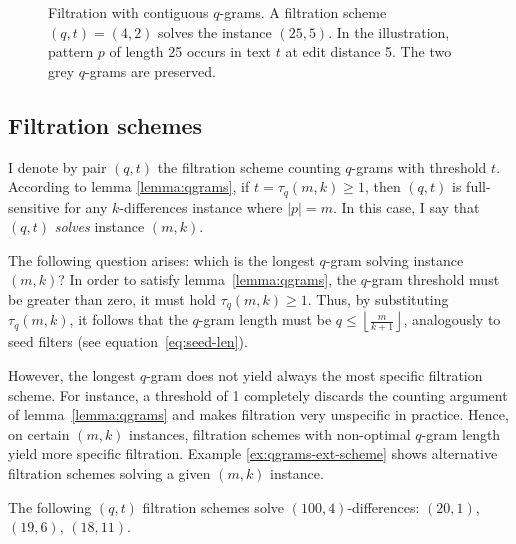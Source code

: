 \begin{figure}[h]
\begin{center}
\caption[Filtration with contiguous $q$-grams]{Filtration with contiguous $q$-grams. A filtration scheme $(q,t) = (4,2)$ solves the instance $(25,5)$. In the illustration, pattern $p$ of length 25 occurs in text $t$ at edit distance 5. The two grey $q$-grams are preserved.}
\label{fig:qgrams-ext}

\end{center}
\end{figure}

\subsection{Filtration schemes}
\label{sec:filtering:qgrams-ext:schemes}

I denote by pair $(q,t)$ the filtration scheme counting $q$-grams with threshold $t$.
According to lemma \ref{lemma:qgrams}, if $t = \tau_q(m,k) \geq 1$, then $(q,t)$ is full-sensitive for any $k$-differences instance where $|p|=m$.
In this case, I say that $(q,t)$ \emph{solves} instance $(m,k)$.

The following question arises: which is the longest $q$-gram solving instance $(m,k)$?
In order to satisfy lemma~\ref{lemma:qgrams}, the $q$-gram threshold must be greater than zero, \ie it must hold $\tau_q(m,k) \geq 1$.
Thus, by substituting $\tau_q(m,k)$, it follows that the $q$-gram length must be $q \leq \left \lfloor \frac{m}{k+1} \right \rfloor$, analogously to seed filters (see equation~\ref{eq:seed-len}).

However, the longest $q$-gram does not yield always the most specific filtration scheme.
For instance, a threshold of 1 completely discards the counting argument of lemma~\ref{lemma:qgrams} and makes filtration very unspecific in practice.
Hence, on certain $(m,k)$ instances, filtration schemes with non-optimal $q$-gram length yield more specific filtration.
Example \ref{ex:qgrams-ext-scheme} shows alternative filtration schemes solving a given $(m,k)$ instance.

\begin{example}
\label{ex:qgrams-ext-scheme}
The following $(q,t)$ filtration schemes solve $(100,4)$-differences:
$(20,1)$, $(19,6)$, $(18,11)$.
\end{example}

